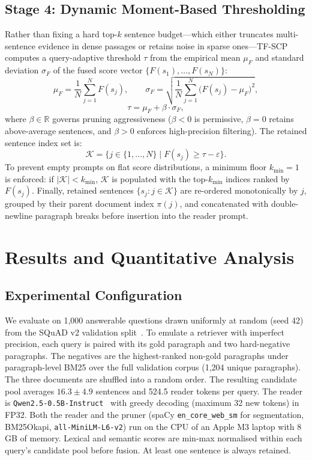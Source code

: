 \documentclass[conference]{IEEEtran}
\begin{document}
\subsection{Stage 4: Dynamic Moment-Based Thresholding}
Rather than fixing a hard top-$k$ sentence budget---which either truncates multi-sentence evidence in dense passages or retains noise in sparse ones---TF-SCP computes a query-adaptive threshold $\tau$ from the empirical mean $\mu_F$ and standard deviation $\sigma_F$ of the fused score vector $\{F(s_1), \dots, F(s_N)\}$:
\begin{equation}
\mu_F = \frac{1}{N} \sum_{j=1}^N F(s_j), \qquad
\sigma_F = \sqrt{\frac{1}{N} \sum_{j=1}^N \big(F(s_j) - \mu_F\big)^2},
\end{equation}
\begin{equation}
\tau = \mu_F + \beta \cdot \sigma_F,
\label{eq:threshold}
\end{equation}
where $\beta \in \mathbb{R}$ governs pruning aggressiveness ($\beta < 0$ is permissive, $\beta = 0$ retains above-average sentences, and $\beta > 0$ enforces high-precision filtering). The retained sentence index set is:
\begin{equation}
\mathcal{K} = \{ j \in \{1, \dots, N\} \mid F(s_j) \ge \tau - \varepsilon \}.
\end{equation}
To prevent empty prompts on flat score distributions, a minimum floor $k_{\min} = 1$ is enforced: if $|\mathcal{K}| < k_{\min}$, $\mathcal{K}$ is populated with the top-$k_{\min}$ indices ranked by $F(s_j)$. Finally, retained sentences $\{s_j : j \in \mathcal{K}\}$ are re-ordered monotonically by $j$, grouped by their parent document index $\pi(j)$, and concatenated with double-newline paragraph breaks before insertion into the reader prompt.

\section{Results and Quantitative Analysis}

\subsection{Experimental Configuration}

We evaluate on 1,000 answerable questions drawn uniformly at random (seed 42) from the SQuAD v2 validation split~\cite{rajpurkar2018squad2}. To emulate a retriever with imperfect precision, each query is paired with its gold paragraph and two hard-negative paragraphs. The negatives are the highest-ranked non-gold paragraphs under paragraph-level BM25 over the full validation corpus (1,204 unique paragraphs). The three documents are shuffled into a random order. The resulting candidate pool averages $16.3 \pm 4.9$ sentences and 524.5 reader tokens per query. The reader is \texttt{Qwen2.5-0.5B-Instruct}~\cite{qwen2024qwen25} with greedy decoding (maximum 32 new tokens) in FP32. Both the reader and the pruner (spaCy \texttt{en\_core\_web\_sm} for segmentation, BM25Okapi, \texttt{all-MiniLM-L6-v2}) run on the CPU of an Apple M3 laptop with 8 GB of memory. Lexical and semantic scores are min-max normalised within each query's candidate pool before fusion. At least one sentence is always retained.
\end{document}

